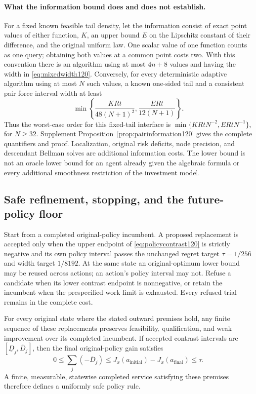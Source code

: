\paragraph{What the information bound does and does not establish.}
For a fixed known feasible tail density, let the information consist of
exact point values of either function, $K$, an upper bound $E$ on the
Lipschitz constant of their difference, and the original uniform law.
One scalar value of one function counts as one query; obtaining both
values at a common point costs two.  With this convention there is an
algorithm using at most $4n+8$ values and having the width in
\eqref{eq:mixedwidth120}.  Conversely, for every deterministic adaptive
algorithm using at most $N$ such values, a known one-sided tail and a
consistent pair force interval width at least
\begin{equation}\label{eq:pairlower120}
 \min\left\{\frac{KRt}{48(N+1)^2},
                    \frac{ERt}{12(N+1)}\right\}.
\end{equation}
Thus the worst-case order for this fixed-tail interface is
$\min\{KRtN^{-2},ERtN^{-1}\}$, for $N\ge32$.
Supplement Proposition~\ref{prop:pairinformation120} gives the complete
quantifiers and proof.  Localization, original risk deficits, node
precision, and descendant Bellman solves are additional information
costs.  The lower bound is not an oracle lower bound for an agent already
given the algebraic formula or every additional smoothness restriction
of the investment model.

\subsection{Safe refinement, stopping, and the future-policy floor}
Start from a completed original-policy incumbent.  A proposed replacement
is accepted only when the upper endpoint of
\eqref{eq:policycontrast120} is strictly negative and its own policy
interval passes the unchanged regret target $\tau=1/256$ and width
target $1/8192$.  At the same state an original-optimum lower bound
may be reused across actions; an action's policy interval may not.
Refuse a candidate when its lower contrast endpoint is nonnegative,
or retain the incumbent when the prespecified work limit is exhausted.
Every refused trial remains in the complete cost.

\begin{proposition}
\label{prop:safe120}
For every original state where the stated outward premises hold,
any finite sequence of these replacements preserves feasibility,
qualification, and weak improvement over its completed incumbent.
If accepted contrast intervals are $[\underline D_j,\overline D_j]$,
then the final original-policy gain satisfies
\begin{equation}\label{eq:gainaccount120}
 0\le\sum_j(-\overline D_j)
       \le J_x(a_{\mathrm{initial}})-J_x(a_{\mathrm{final}})
       \le\tau .
\end{equation}
A finite, measurable, statewise completed service satisfying these
premises therefore defines a uniformly safe policy rule.
\end{proposition}

